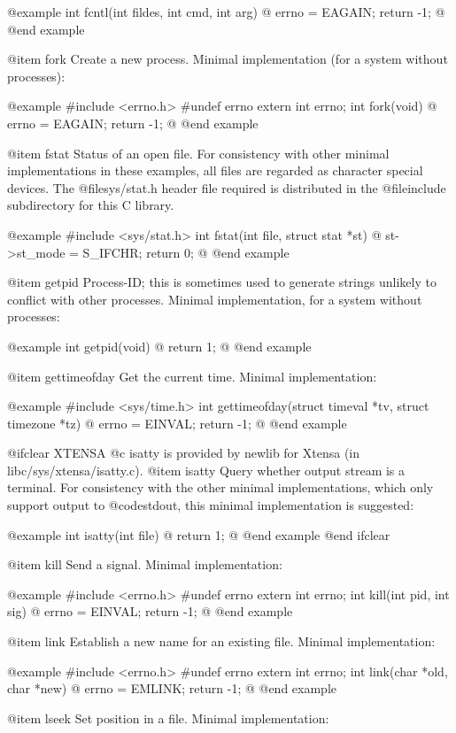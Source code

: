 @example
int fcntl(int fildes, int cmd, int arg) @{
  errno = EAGAIN;
  return -1;
@}
@end example

@item fork
Create a new process.  Minimal implementation (for a system without processes):

@example
#include <errno.h>
#undef errno
extern int errno;
int fork(void) @{
  errno = EAGAIN;
  return -1;
@}
@end example

@item fstat
Status of an open file.  For consistency with other minimal
implementations in these examples, all files are regarded as character
special devices.  The @file{sys/stat.h} header file required is
distributed in the @file{include} subdirectory for this C library.

@example
#include <sys/stat.h>
int fstat(int file, struct stat *st) @{
  st->st_mode = S_IFCHR;
  return 0;
@}
@end example

@item getpid
Process-ID; this is sometimes used to generate strings unlikely to
conflict with other processes.  Minimal implementation, for a system
without processes:

@example
int getpid(void) @{
  return 1;
@}
@end example

@item gettimeofday
Get the current time.  Minimal implementation:

@example
#include <sys/time.h>
int gettimeofday(struct timeval *tv,
                 struct timezone *tz) @{
  errno = EINVAL;
  return -1;
@}
@end example

@ifclear XTENSA
@c isatty is provided by newlib for Xtensa (in libc/sys/xtensa/isatty.c).
@item isatty
Query whether output stream is a terminal.   For consistency with the
other minimal implementations, which only support output to
@code{stdout}, this minimal implementation is suggested:

@example
int isatty(int file) @{
  return 1;
@}
@end example
@end ifclear

@item kill
Send a signal.  Minimal implementation:

@example
#include <errno.h>
#undef errno
extern int errno;
int kill(int pid, int sig) @{
  errno = EINVAL;
  return -1;
@}
@end example

@item link
Establish a new name for an existing file.  Minimal implementation:

@example
#include <errno.h>
#undef errno
extern int errno;
int link(char *old, char *new) @{
  errno = EMLINK;
  return -1;
@}
@end example

@item lseek
Set position in a file.  Minimal implementation:

